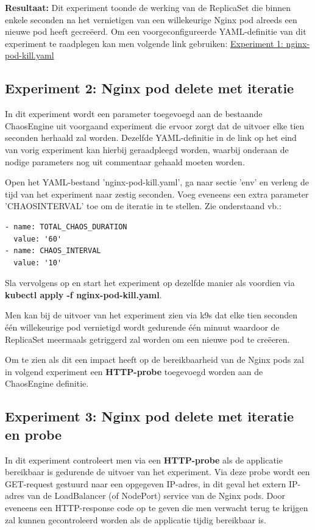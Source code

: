 {\bf Resultaat:} Dit experiment toonde de werking van de ReplicaSet die binnen enkele seconden na het vernietigen van een willekeurige Nginx pod alreeds een nieuwe pod heeft gecreëerd.
Om een voorgeconfigureerde YAML-definitie van dit experiment te raadplegen kan men volgende link gebruiken: \href{https://github.com/KenBruggeman/BP\textunderscore 21-22/blob/master/bachelorproef/docs/litmus%20experimenten/nginx-pod-kill.yaml}{Experiment 1: nginx-pod-kill.yaml}

\subsection{Experiment 2: Nginx pod delete met iteratie}

In dit experiment wordt een parameter toegevoegd aan de bestaande ChaosEngine uit voorgaand experiment die ervoor zorgt dat de uitvoer elke tien seconden herhaald zal worden. Dezelfde YAML-definitie in de link op het eind van vorig experiment kan hierbij geraadpleegd worden, waarbij onderaan de nodige parameters nog uit commentaar gehaald moeten worden.  

Open het YAML-bestand 'nginx-pod-kill.yaml', ga naar sectie 'env' en verleng de tijd van het experiment naar zestig seconden. Voeg eveneens een extra parameter 'CHAOS\textunderscore INTERVAL' toe om de iteratie in te stellen. Zie onderstaand vb.:
\begin{lstlisting}
- name: TOTAL_CHAOS_DURATION
  value: '60'
- name: CHAOS_INTERVAL
  value: '10'
\end{lstlisting}

Sla vervolgens op en start het experiment op dezelfde manier als voordien via {\bf kubectl apply -f nginx-pod-kill.yaml}. 

Men kan bij de uitvoer van het experiment zien via k9s dat elke tien seconden één willekeurige pod vernietigd wordt gedurende één minuut waardoor de ReplicaSet meermaals getriggerd zal worden om een nieuwe pod te creëeren.

Om te zien als dit een impact heeft op de bereikbaarheid van de Nginx pods zal in volgend experiment een {\bf HTTP-probe} toegevoegd worden aan de ChaosEngine definitie. 

\subsection{Experiment 3: Nginx pod delete met iteratie en probe}

In dit experiment controleert men via een {\bf HTTP-probe} als de applicatie bereikbaar is gedurende de uitvoer van het experiment. Via deze probe wordt een GET-request gestuurd naar een opgegeven IP-adres, in dit geval het extern IP-adres van de LoadBalancer (of NodePort) service van de Nginx pods. Door eveneens een HTTP-response code op te geven die men verwacht terug te krijgen zal kunnen gecontroleerd worden als de applicatie tijdig bereikbaar is. 

